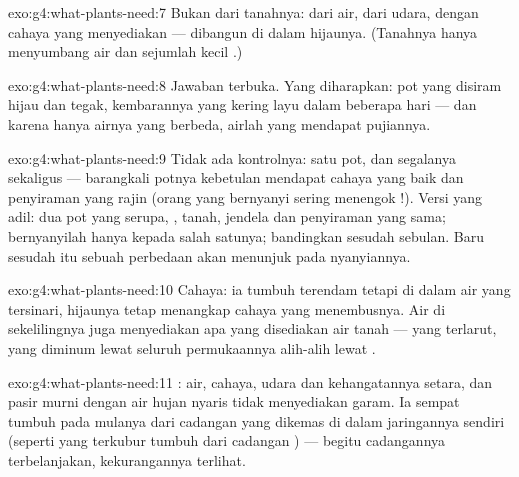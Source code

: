 \begin{solution}{exo:g4:what-plants-need:7}
Bukan dari tanahnya: dari air, dari udara, dengan cahaya yang
menyediakan  --- dibangun di dalam  hijaunya. (Tanahnya
hanya menyumbang air dan sejumlah kecil .)
\end{solution}

\begin{solution}{exo:g4:what-plants-need:8}
Jawaban terbuka. Yang diharapkan: pot yang disiram hijau dan tegak,
kembarannya yang kering layu dalam beberapa hari --- dan karena hanya
airnya yang berbeda, airlah yang mendapat pujiannya.
\end{solution}

\begin{solution}{exo:g4:what-plants-need:9}
Tidak ada kontrolnya: satu pot, dan segalanya sekaligus --- barangkali
potnya kebetulan mendapat cahaya yang baik dan penyiraman yang rajin
(orang yang bernyanyi sering menengok !). Versi yang adil:
dua pot yang serupa, , tanah, jendela dan penyiraman yang sama;
bernyanyilah hanya kepada salah satunya; bandingkan sesudah sebulan.
Baru sesudah itu sebuah perbedaan akan menunjuk pada nyanyiannya.
\end{solution}

\begin{solution}{exo:g4:what-plants-need:10}
Cahaya: ia tumbuh terendam tetapi di dalam air yang tersinari, 
hijaunya tetap menangkap cahaya yang menembusnya. Air di sekelilingnya
juga menyediakan apa yang disediakan air tanah ---  yang
terlarut, yang diminum lewat seluruh permukaannya alih-alih lewat
.
\end{solution}

\begin{solution}{exo:g4:what-plants-need:11}
: air, cahaya, udara dan kehangatannya setara, dan pasir
murni dengan air hujan nyaris tidak menyediakan garam. Ia sempat
tumbuh pada mulanya dari cadangan yang dikemas di dalam jaringannya
sendiri (seperti  yang terkubur tumbuh dari cadangan )
--- begitu cadangannya terbelanjakan, kekurangannya terlihat.
\end{solution}
